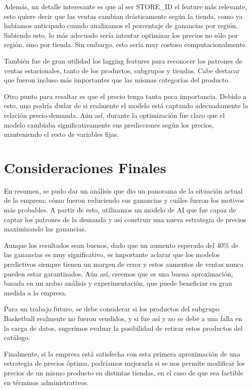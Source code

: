 \documentclass[12pt,a4paper]{article}
\begin{document}
Además, un detalle interesante es que al ser STORE\_ID el feature más relevante, 
esto quiere decir que las ventas cambian drásticamente según la tienda, como ya habíamos anticipado cuando analizamos el porcentaje de ganancias por región. 
Sabiendo esto, lo más adecuado sería intentar optimizar los precios no sólo por región, sino por tienda. Sin embargo, esto sería muy costoso computacionalmente.

\vspace{0.2cm}

También fue de gran utilidad los lagging features para reconocer los patrones de ventas estacionales, tanto de los productos, subgrupos y tiendas. Cabe destacar 
que fueron incluso más importantes que las mismas categorías del producto.

\vspace{0.2cm}

Otro punto para resaltar es que el precio tenga tanta poca importancia. Debido a esto, uno podría dudar de si realmente el modelo 
está captando adecuadamente la relación precio-demanda. Aún así, durante la optimización fue claro que el modelo cambiaba significativamente sus 
predicciones según los precios, manteniendo el resto de variables fijas.






\newpage

\section{Consideraciones Finales}

En resumen, se pudo dar un análisis que dio un panorama de la situación actual de la empresa: cómo 
fueron reduciendo sus ganancias y cuáles fueron los motivos más probables. A partir de esto, utilizamos un 
modelo de AI que fue capaz de captar los patrones de la demanda y así construir una nueva estrategia de precios 
maximizando las ganancias. 

\vspace{0.2cm}

Aunque los resultados sean buenos, dado que un aumento esperado del 40\% de las ganancias es muy significativo, es 
importante aclarar que los modelos predictivos siempre tienen un margen de error y estos aumentos de ventas 
nunca pueden estar garantizados. Aún así, creemos que es una buena aproximación, basada en un arduo análisis 
y experimentación, que puede beneficiar en gran medida a la empresa.

\vspace{0.2cm}

Para un trabajo futuro, se debe considerar si los productos del subgrupo Basketball realmente no fueron 
vendidos, y si fue así y no se debe a una falla en la carga de datos, sugerimos evaluar la posibilidad de retirar estos 
productos del catálogo. 

\vspace{0.2cm}

Finalmente, si la empresa está satisfecha con esta primera aproximación de una estrategia de precios óptima, 
podríamos mejorarla si se nos permite modificar los precios de un mismo producto en distintas tiendas, 
en el caso de que sea factible en términos administrativos.
\end{document}
